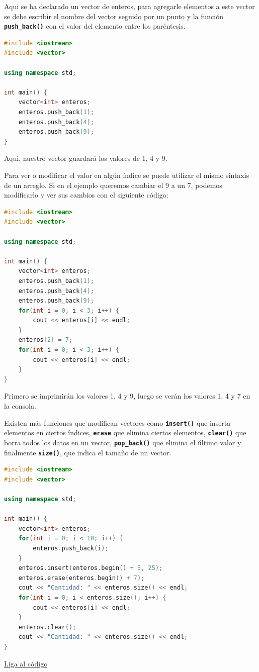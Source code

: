 \documentclass{article}
\begin{document}
Aqui se ha declarado un vector de enteros, para agregarle elementos a este vector se debe escribir el nombre del vector seguido por un punto y la función \textbf{\lstinline{push_back()}} con el valor del elemento entre los paréntesis.

\begin{lstlisting}[language=C++, caption=Agregando valores]
#include <iostream>
#include <vector>

using namespace std;

int main() {
    vector<int> enteros;
    enteros.push_back(1);
    enteros.push_back(4);
    enteros.push_back(9);
}
\end{lstlisting}

Aqui, nuestro vector guardará los valores de 1, 4 y 9.

Para ver o modificar el valor en algún índice se puede utilizar el mismo sintaxis de un arreglo. Si en el ejemplo queremos cambiar el 9 a un 7, podemos modificarlo y ver sus cambios con el siguiente código:

\begin{lstlisting}[language=C++, caption=Modificando valores]
#include <iostream>
#include <vector>

using namespace std;

int main() {
    vector<int> enteros;
    enteros.push_back(1);
    enteros.push_back(4);
    enteros.push_back(9);
    for(int i = 0; i < 3; i++) {
        cout << enteros[i] << endl;
    }
    enteros[2] = 7;
    for(int i = 0; i < 3; i++) {
        cout << enteros[i] << endl;
    }
}
\end{lstlisting}

Primero se imprimirán los valores 1, 4 y 9, luego se verán los valores 1, 4 y 7 en la consola.

Existen más funciones que modifican vectores como \textbf{\lstinline{insert()}} que inserta elementos en ciertos índices, \textbf{\lstinline{erase}} que elimina ciertos elementos, \textbf{\lstinline{clear()}} que borra todos los datos en un vector, \textbf{\lstinline{pop_back()}} que elimina el último valor y finalmente \textbf{\lstinline{size()}}, que indica el tamaño de un vector.

\begin{lstlisting}[language=C++, caption=Jugando con vectores]
#include <iostream>
#include <vector>

using namespace std;

int main() {
    vector<int> enteros;
    for(int i = 0; i < 10; i++) {
        enteros.push_back(i);
    }
    enteros.insert(enteros.begin() + 5, 25);
    enteros.erase(enteros.begin() + 7);
    cout << "Cantidad: " << enteros.size() << endl;
    for(int i = 0; i < enteros.size(); i++) {
        cout << enteros[i] << endl;
    }
    enteros.clear();
    cout << "Cantidad: " << enteros.size() << endl;
}
\end{lstlisting}
\href{https://repl.it/@Jamesscn/Juego-de-Vectores}{Liga al código}\\
\end{document}
